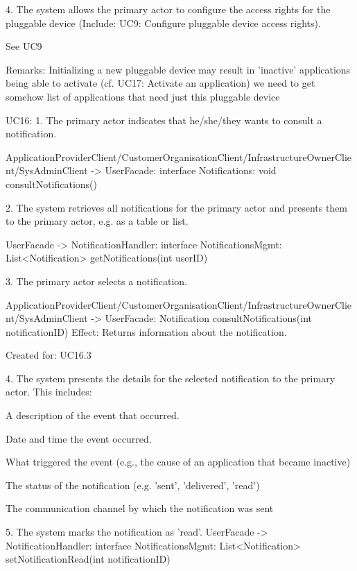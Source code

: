 {{{        4. The system allows the primary actor to configure the access rights for the pluggable device (Include: UC9: Configure pluggable device access rights).

            See UC9

        Remarks:
            Initializing a new pluggable device may result in 'inactive' applications being able to activate
            (cf. UC17: Activate an application) we need to get somehow list of applications that need just this pluggable device

    UC16:
        1. The primary actor indicates that he/she/they wants to consult a notification.

            ApplicationProviderClient/CustomerOrganisationClient/InfrastructureOwnerClient/SysAdminClient -> UserFacade: interface Notifications: void consultNotifications()

        2. The system retrieves all notifications for the primary actor and presents them to the primary actor, e.g. as a table or list.

            UserFacade -> NotificationHandler: interface NotificationsMgmt: List<Notification> getNotifications(int userID)

        3. The primary actor selects a notification.

            ApplicationProviderClient/CustomerOrganisationClient/InfrastructureOwnerClient/SysAdminClient -> UserFacade: Notification consultNotifications(int notificationID)
                Effect: Returns information about the notification.
                \item Created for: UC16.3

        4. The system presents the details for the selected notification to the primary actor. This includes:
            { A description of the event that occurred.

            { Date and time the event occurred.

            { What triggered the event (e.g., the cause of an application that became inactive)

            { The status of the notification (e.g. 'sent', 'delivered', 'read')

            { The communication channel by which the notification was sent


        5. The system marks the notification as 'read'.
            UserFacade -> NotificationHandler: interface NotificationsMgmt: List<Notification> setNotificationRead(int notificationID)

}}}}}}}}
